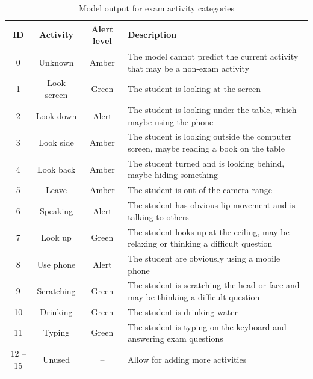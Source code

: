 \begin{table}[!ht]
\renewcommand{\arraystretch}{1.1}
\newcommand{\green}{\color{caribbeangreen} Green}
\newcommand{\amber}{\color{amber} Amber}
\newcommand{\red}{\color{carminered} Alert}
\begin{tabularx}{\textwidth}{|c|c|c|X|}
\hline
ID & Activity    & Alert level & Description \\ \hline
0           & Unknown     & \amber & The model cannot predict the current activity that may be a non-exam activity \\ \hline
1           & Look screen & \green & The student is looking at the screen \\ \hline
2           & Look down   & \red   & The student is looking under the table, which maybe using the phone \\ \hline
3           & Look side   & \amber & The student is looking outside the computer screen, maybe reading a book on the table \\ \hline
4           & Look back   & \amber & The student turned and is looking behind, maybe hiding something \\ \hline
5           & Leave       & \amber & The student is out of the camera range \\ \hline
6           & Speaking    & \red   & The student has obvious lip movement and is talking to others \\ \hline
7           & Look up     & \green & The student looks up at the ceiling, may be relaxing or thinking a difficult question \\ \hline
8           & Use phone   & \red   & The student are obviously using a mobile phone \\ \hline
9           & Scratching  & \green & The student is scratching the head or face and may be thinking a difficult question \\ \hline
10          & Drinking    & \green & The student is drinking water \\ \hline
11          & Typing      & \green & The student is typing on the keyboard and answering exam questions \\ \hline
12 -- 15    & Unused      & --     & Allow for adding more activities \\ \hline
\end{tabularx}
\caption{Model output for exam activity categories}
\label{tab:Model output}
\end{table}

